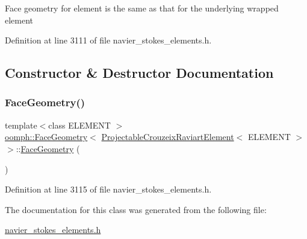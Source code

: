 Face geometry for element is the same as that for the underlying wrapped element 

Definition at line 3111 of file navier\+\_\+stokes\+\_\+elements.\+h.



\subsection{Constructor \& Destructor Documentation}
\mbox{\label{classoomph_1_1FaceGeometry_3_01ProjectableCrouzeixRaviartElement_3_01ELEMENT_01_4_01_4_afdd827eb3df6674ad9b01b63d1127ab3}} 
\subsubsection{\texorpdfstring{Face\+Geometry()}{FaceGeometry()}}
{\footnotesize\ttfamily template$<$class E\+L\+E\+M\+E\+NT $>$ \\
\hyperlink{classoomph_1_1FaceGeometry}{oomph\+::\+Face\+Geometry}$<$ \hyperlink{classoomph_1_1ProjectableCrouzeixRaviartElement}{Projectable\+Crouzeix\+Raviart\+Element}$<$ E\+L\+E\+M\+E\+NT $>$ $>$\+::\hyperlink{classoomph_1_1FaceGeometry}{Face\+Geometry} (\begin{DoxyParamCaption}{ }\end{DoxyParamCaption})\hspace{0.3cm}{\ttfamily [inline]}}



Definition at line 3115 of file navier\+\_\+stokes\+\_\+elements.\+h.



The documentation for this class was generated from the following file\+:\begin{DoxyCompactItemize}
\item 
\hyperlink{navier__stokes__elements_8h}{navier\+\_\+stokes\+\_\+elements.\+h}\end{DoxyCompactItemize}
